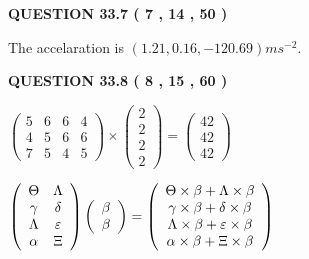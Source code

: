\documentclass[12pt]{article}
\begin{document}
 
 
  
\vspace{0.2in}
  
{\textbf{\Large{QUESTION
33.7 
 (           7 ,          14 ,          50 )
}}}
  
  
 
 
\noindent{}
 
 
  The accelaration is $  %
(
1.21,
0.16,
-120.69)
ms^{-2} $.
 
 
 
 
  
\vspace{0.2in}
  
{\textbf{\Large{QUESTION
33.8 
 (           8 ,          15 ,          60 )
}}}
  
  
 
 
\noindent{}

 
$\left( \begin{array}{ccccccccccccccc}
           5  & 
           6  & 
           6  & 
           4  \\ 
           4  & 
           5  & 
           6  & 
           6  \\ 
           7  & 
           5  & 
           4  & 
           5
\end{array}\right) \times
\left( \begin{array}{c}
           2  \\ 
           2  \\ 
           2  \\ 
           2
\end{array}\right)  =
\left( \begin{array}{c}
          42  \\ 
          42  \\ 
          42
\end{array}\right)  $
 
$  %
 \left( \begin{array}
 {
 c
 c
 }
 \Theta & 
 \Lambda \\ 
 \gamma & 
 \delta \\ 
 \Lambda & 
 \varepsilon \\ 
 \alpha & 
                    \Xi
 \end{array} \right)
 \left( \begin{array}
 {
 c
 }
 \beta \\ 
 \beta
 \end{array} \right)
=
 \left( \begin{array}
 {
 c
 }
  \Theta \times  \beta +  \Lambda \times  \beta \\ 
  \gamma \times  \beta +  \delta \times  \beta \\ 
  \Lambda \times  \beta +  \varepsilon \times  \beta \\ 
  \alpha \times  \beta +                     \Xi \times  \beta
 \end{array} \right)
$
 
\end{document}
